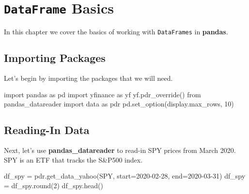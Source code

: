 \documentclass[
  letterpaper,
  DIV=11,
  numbers=noendperiod]{scrreprt}
\newenvironment{Shaded}{\begin{snugshade}}{\end{snugshade}}
\newcommand{\BuiltInTok}[1]{\textcolor[rgb]{0.00,0.23,0.31}{#1}}
\newcommand{\DecValTok}[1]{\textcolor[rgb]{0.68,0.00,0.00}{#1}}
\newcommand{\ImportTok}[1]{\textcolor[rgb]{0.00,0.46,0.62}{#1}}
\newcommand{\NormalTok}[1]{\textcolor[rgb]{0.00,0.23,0.31}{#1}}
\newcommand{\OperatorTok}[1]{\textcolor[rgb]{0.37,0.37,0.37}{#1}}
\newcommand{\StringTok}[1]{\textcolor[rgb]{0.13,0.47,0.30}{#1}}
\begin{document}

\hypertarget{dataframe-basics}{%
\chapter{\texorpdfstring{\texttt{DataFrame}
Basics}{DataFrame Basics}}\label{dataframe-basics}}

In this chapter we cover the basics of working with \texttt{DataFrames}
in \textbf{pandas}.

\hypertarget{importing-packages-1}{%
\section{Importing Packages}\label{importing-packages-1}}

Let's begin by importing the packages that we will need.

\begin{Shaded}
\begin{Highlighting}[]
\ImportTok{import}\NormalTok{ pandas }\ImportTok{as}\NormalTok{ pd}
\ImportTok{import}\NormalTok{ yfinance }\ImportTok{as}\NormalTok{ yf}
\NormalTok{yf.pdr\_override()}
\ImportTok{from}\NormalTok{ pandas\_datareader }\ImportTok{import}\NormalTok{ data }\ImportTok{as}\NormalTok{ pdr}
\NormalTok{pd.set\_option(}\StringTok{\textquotesingle{}display.max\_rows\textquotesingle{}}\NormalTok{, }\DecValTok{10}\NormalTok{)}
\end{Highlighting}
\end{Shaded}

\hypertarget{reading-in-data}{%
\section{Reading-In Data}\label{reading-in-data}}

Next, let's use \textbf{pandas\_datareader} to read-in SPY prices from
March 2020. SPY is an ETF that tracks the S\&P500 index.

\begin{Shaded}
\begin{Highlighting}[]
\NormalTok{df\_spy }\OperatorTok{=}\NormalTok{ pdr.get\_data\_yahoo(}\StringTok{\textquotesingle{}SPY\textquotesingle{}}\NormalTok{, start}\OperatorTok{=}\StringTok{\textquotesingle{}2020{-}02{-}28\textquotesingle{}}\NormalTok{, end}\OperatorTok{=}\StringTok{\textquotesingle{}2020{-}03{-}31\textquotesingle{}}\NormalTok{)}
\NormalTok{df\_spy }\OperatorTok{=}\NormalTok{ df\_spy.}\BuiltInTok{round}\NormalTok{(}\DecValTok{2}\NormalTok{)}
\NormalTok{df\_spy.head()}
\end{Highlighting}
\end{Shaded}
\end{document}
